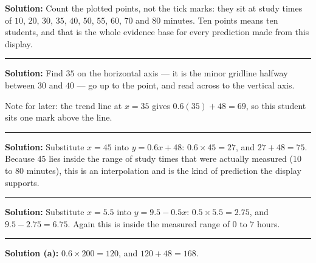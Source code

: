 \documentclass[12pt]{article}
\begin{document}



\textbf{Solution:} \quad Count the plotted points, not the tick marks: they sit at study times of
$10$, $20$, $30$, $35$, $40$, $50$, $55$, $60$, $70$ and $80$ minutes. Ten points means ten
students, and that is the whole evidence base for every prediction made from this display.

\vspace{0.15cm}\noindent\rule{\linewidth}{0.2pt}


\textbf{Solution:} \quad Find $35$ on the horizontal axis --- it is the minor gridline halfway
between $30$ and $40$ --- go up to the point, and read across to the vertical axis. 

\noindent Note for later: the trend line at $x = 35$ gives $0.6(35) + 48 = 69$, so this student sits
one mark above the line.

\vspace{0.15cm}\noindent\rule{\linewidth}{0.2pt}


\textbf{Solution:} \quad Substitute $x = 45$ into $y = 0.6x + 48$:
$0.6 \times 45 = 27$, and $27 + 48 = 75$. Because $45$ lies inside the range of study times that
were actually measured ($10$ to $80$ minutes), this is an interpolation and is the kind of
prediction the display supports. 

\vspace{0.15cm}\noindent\rule{\linewidth}{0.2pt}


\textbf{Solution:} \quad Substitute $x = 5.5$ into $y = 9.5 - 0.5x$:
$0.5 \times 5.5 = 2.75$, and $9.5 - 2.75 = 6.75$. Again this is inside the measured range of $0$ to
$7$ hours. 

\vspace{0.15cm}\noindent\rule{\linewidth}{0.2pt}


\textbf{Solution (a):} \quad $0.6 \times 200 = 120$, and $120 + 48 = 168$. 
\end{document}
